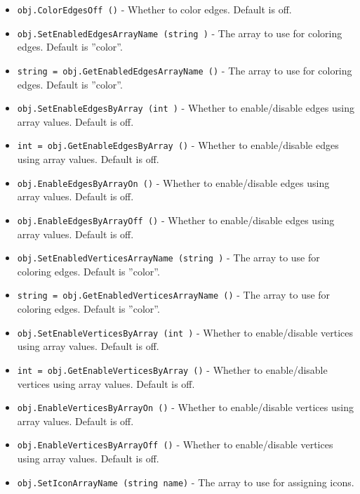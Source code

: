 \begin{itemize}
\item  \verb|obj.ColorEdgesOff ()| -  Whether to color edges.  Default is off.

\item  \verb|obj.SetEnabledEdgesArrayName (string )| -  The array to use for coloring edges.  Default is ''color''.

\item  \verb|string = obj.GetEnabledEdgesArrayName ()| -  The array to use for coloring edges.  Default is ''color''.

\item  \verb|obj.SetEnableEdgesByArray (int )| -  Whether to enable/disable edges using array values.  Default is off.

\item  \verb|int = obj.GetEnableEdgesByArray ()| -  Whether to enable/disable edges using array values.  Default is off.

\item  \verb|obj.EnableEdgesByArrayOn ()| -  Whether to enable/disable edges using array values.  Default is off.

\item  \verb|obj.EnableEdgesByArrayOff ()| -  Whether to enable/disable edges using array values.  Default is off.

\item  \verb|obj.SetEnabledVerticesArrayName (string )| -  The array to use for coloring edges.  Default is ''color''.

\item  \verb|string = obj.GetEnabledVerticesArrayName ()| -  The array to use for coloring edges.  Default is ''color''.

\item  \verb|obj.SetEnableVerticesByArray (int )| -  Whether to enable/disable vertices using array values.  Default is off.

\item  \verb|int = obj.GetEnableVerticesByArray ()| -  Whether to enable/disable vertices using array values.  Default is off.

\item  \verb|obj.EnableVerticesByArrayOn ()| -  Whether to enable/disable vertices using array values.  Default is off.

\item  \verb|obj.EnableVerticesByArrayOff ()| -  Whether to enable/disable vertices using array values.  Default is off.

\item  \verb|obj.SetIconArrayName (string name)| -  The array to use for assigning icons.


\end{itemize}
